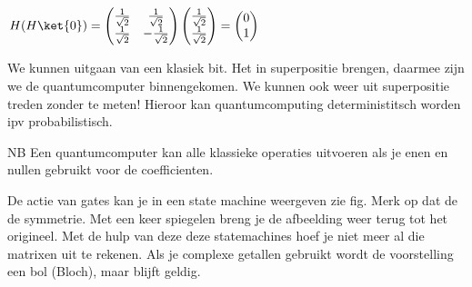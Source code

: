 $H(H\ket{0})=
\begin{pmatrix} 
\tfrac{1}{\sqrt{2}} & \tfrac{1}{\sqrt{2}}  \\ 
\tfrac{1}{\sqrt{2}} & -\tfrac{1}{\sqrt{2}} 
\end{pmatrix} 
\begin{pmatrix} 
\tfrac{1}{\sqrt{2}}  \\ 
\tfrac{1}{\sqrt{2}}
\end{pmatrix} 
=
\begin{pmatrix} 
0\\
1
\end{pmatrix} 
$

We kunnen uitgaan van een klasiek bit. Het in superpositie brengen, daarmee zijn we de quantumcomputer binnengekomen. We kunnen ook weer uit superpositie treden zonder te meten! Hieroor kan quantumcomputing deterministitsch worden ipv probabilistisch.

NB Een quantumcomputer kan alle klassieke operaties uitvoeren als je enen en nullen gebruikt voor de co\:efficienten.

De actie van gates kan je in een state machine weergeven zie fig. 
Merk op dat de de symmetrie. Met een keer spiegelen breng je de afbeelding weer terug tot het origineel. Met de hulp van deze deze statemachines hoef je niet meer al die matrixen uit te rekenen. Als je complexe getallen gebruikt wordt de voorstelling een bol (Bloch), maar blijft geldig.

